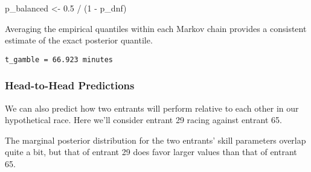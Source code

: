 \documentclass[
  letterpaper,
  DIV=11,
  numbers=noendperiod]{scrartcl}
\newenvironment{Shaded}{\begin{snugshade}}{\end{snugshade}}
\newcommand{\DecValTok}[1]{\textcolor[rgb]{0.68,0.00,0.00}{#1}}
\newcommand{\FloatTok}[1]{\textcolor[rgb]{0.68,0.00,0.00}{#1}}
\newcommand{\FunctionTok}[1]{\textcolor[rgb]{0.28,0.35,0.67}{#1}}
\newcommand{\NormalTok}[1]{\textcolor[rgb]{0.00,0.23,0.31}{#1}}
\newcommand{\OtherTok}[1]{\textcolor[rgb]{0.00,0.23,0.31}{#1}}
\newcommand{\SpecialCharTok}[1]{\textcolor[rgb]{0.37,0.37,0.37}{#1}}
\newcommand{\StringTok}[1]{\textcolor[rgb]{0.13,0.47,0.30}{#1}}
\begin{document}
\begin{Shaded}
\begin{Highlighting}[]
\NormalTok{p\_balanced }\OtherTok{\textless{}{-}} \FloatTok{0.5} \SpecialCharTok{/}\NormalTok{ (}\DecValTok{1} \SpecialCharTok{{-}}\NormalTok{ p\_dnf)}
\end{Highlighting}
\end{Shaded}

Averaging the empirical quantiles within each Markov chain provides a
consistent estimate of the exact posterior quantile.

\begin{Shaded}
\end{Shaded}

\begin{verbatim}
t_gamble = 66.923 minutes
\end{verbatim}

\subsubsection{Head-to-Head Predictions}\label{head-to-head-predictions}

We can also predict how two entrants will perform relative to each other
in our hypothetical race. Here we'll consider entrant 29 racing against
entrant 65.

The marginal posterior distribution for the two entrants' skill
parameters overlap quite a bit, but that of entrant 29 does favor larger
values than that of entrant 65.
\end{document}
